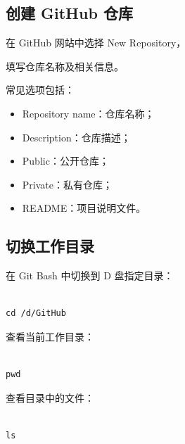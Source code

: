 \subsection{创建 GitHub 仓库}



在 GitHub 网站中选择 New Repository，

填写仓库名称及相关信息。



常见选项包括：



\begin{itemize}

    \item Repository name：仓库名称；

    \item Description：仓库描述；

    \item Public：公开仓库；

    \item Private：私有仓库；

    \item README：项目说明文件。

\end{itemize}



\subsection{切换工作目录}



在 Git Bash 中切换到 D 盘指定目录：



\begin{lstlisting}

cd /d/GitHub

\end{lstlisting}



查看当前工作目录：



\begin{lstlisting}

pwd

\end{lstlisting}



查看目录中的文件：



\begin{lstlisting}

ls

\end{lstlisting}



